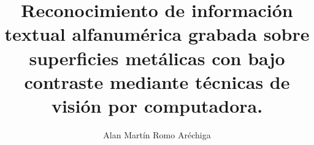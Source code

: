 \documentclass[12pt]{uaztesis}
\numberwithin{listing}{chapter}
\begin{document}
\thesism %

\hyphenation{}

\clearpage{}


\title{Reconocimiento de información textual alfanumérica grabada sobre superficies metálicas con bajo contraste mediante técnicas de visión por computadora.}
\author{Alan Martín Romo Aréchiga}

 
 

\date{\the\year{}}


\maketitle





\begin{resumen}
  
\end{resumen}

\begin{abstract}
  
\end{abstract}

\begin{dedicatoria}
  
\end{dedicatoria}

\begin{agradecimientos}
  
\end{agradecimientos}
\end{document}

